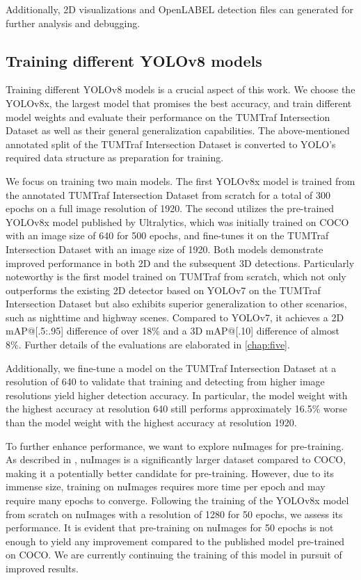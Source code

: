Additionally, 2D visualizations and OpenLABEL detection files can generated for further analysis and debugging.

\subsection{Training different YOLOv8 models}

Training different YOLOv8 models is a crucial aspect of this work. We choose the YOLOv8x, the largest model that promises the best accuracy, and train different model weights and evaluate their performance on the TUMTraf Intersection Dataset as well as their general generalization capabilities. The above-mentioned annotated split of the TUMTraf Intersection Dataset is converted to YOLO's required data structure as preparation for training. 

We focus on training two main models. The first YOLOv8x model is trained from the annotated TUMTraf Intersection Dataset from scratch for a total of 300 epochs on a full image resolution of 1920. The second utilizes the pre-trained YOLOv8x model published by Ultralytics, which was initially trained on COCO with an image size of 640 for 500 epochs, and fine-tunes it on the TUMTraf Intersection Dataset with an image size of 1920. Both models demonstrate improved performance in both 2D and the subsequent 3D detections. Particularly noteworthy is the first model trained on TUMTraf from scratch, which not only outperforms the existing 2D detector based on YOLOv7 on the TUMTraf Intersection Dataset but also exhibits superior generalization to other scenarios, such as nighttime and highway scenes. Compared to YOLOv7, it achieves a 2D mAP@[.5:.95] difference of over 18\% and a 3D mAP@[.10] difference of almost 8\%. Further details of the evaluations are elaborated in \cref{chap:five}. 

Additionally, we fine-tune a model on the TUMTraf Intersection Dataset at a resolution of 640 to validate that training and detecting from higher image resolutions yield higher detection accuracy. In particular, the model weight with the highest accuracy at resolution 640 still performs approximately 16.5\% worse than the model weight with the highest accuracy at resolution 1920. 

To further enhance performance, we want to explore nuImages for pre-training. As described in , nuImages is a significantly larger dataset compared to COCO, making it a potentially better candidate for pre-training. However, due to its immense size, training on nuImages requires more time per epoch and may require many epochs to converge. Following the training of the YOLOv8x model from scratch on nuImages with a resolution of 1280 for 50 epochs, we assess its performance. It is evident that pre-training on nuImages for 50 epochs is not enough to yield any improvement compared to the published model pre-trained on COCO. We are currently continuing the training of this model in pursuit of improved results.

